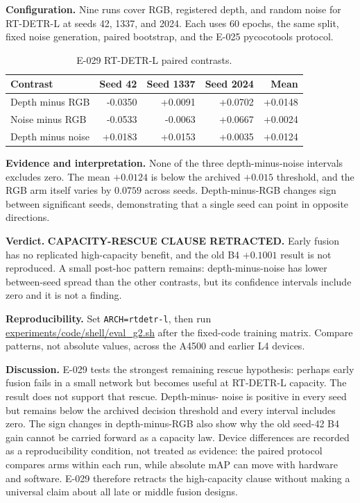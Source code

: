 \documentclass[preprint,12pt]{elsarticle}
\newcommand{\pathcode}[1]{\scriptsize\url{#1}}
\begin{document}
\textbf{Configuration.} Nine runs cover RGB, registered depth, and random
noise for RT-DETR-L at seeds 42, 1337, and 2024. Each uses 60 epochs, the
same split, fixed noise generation, paired bootstrap, and the E-025
pycocotools protocol.

\begin{table}[H]
\centering
\caption{E-029 RT-DETR-L paired contrasts.}
\label{tab:e029}
\begin{tabular}{lrrrr}
\toprule
Contrast & Seed 42 & Seed 1337 & Seed 2024 & Mean\\
\midrule
Depth minus RGB & -0.0350 & +0.0091 & +0.0702 & +0.0148\\
Noise minus RGB & -0.0533 & -0.0063 & +0.0667 & +0.0024\\
Depth minus noise & +0.0183 & +0.0153 & +0.0035 & +0.0124\\
\bottomrule
\end{tabular}
\end{table}

\textbf{Evidence and interpretation.} None of the three depth-minus-noise
intervals excludes zero. The mean \(+0.0124\) is below the archived
\(+0.015\) threshold, and the RGB arm itself varies by \(0.0759\) across
seeds. Depth-minus-RGB changes sign between significant seeds, demonstrating
that a single seed can point in opposite directions.

\textbf{Verdict.} \textbf{CAPACITY-RESCUE CLAUSE RETRACTED.} Early fusion has
no replicated high-capacity benefit, and the old B4 \(+0.1001\) result is not
reproduced. A small post-hoc pattern remains: depth-minus-noise has lower
between-seed spread than the other contrasts, but its confidence intervals
include zero and it is not a finding.

\textbf{Reproducibility.} Set \texttt{ARCH=rtdetr-l}, then run
\pathcode{experiments/code/shell/eval_g2.sh} after
the fixed-code training matrix. Compare patterns, not absolute values, across
the A4500 and earlier L4 devices.

\textbf{Discussion.} E-029 tests the strongest remaining rescue hypothesis:
perhaps early fusion fails in a small network but becomes useful at
RT-DETR-L capacity. The result does not support that rescue. Depth-minus-
noise is positive in every seed but remains below the archived decision threshold
and every interval includes zero. The sign changes in depth-minus-RGB also
show why the old seed-42 B4 gain cannot be carried forward as a capacity law.
Device differences are recorded as a reproducibility condition, not treated
as evidence: the paired protocol compares arms within each run, while
absolute mAP can move with hardware and software. E-029 therefore retracts
the high-capacity clause without making a universal claim about all late or
middle fusion designs.
\end{document}
